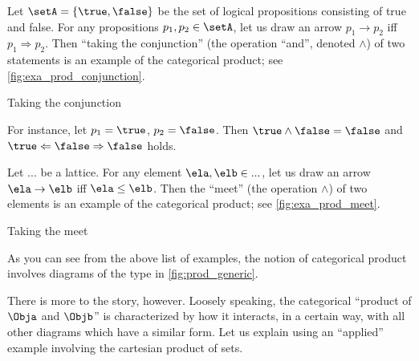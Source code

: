 \begin{example}\label{exa:conjunction-as-prod}
Let $\setA = \{ \true, \false \}$ be the set of logical propositions consisting of true and false. For any propositions $p_1, p_2  \in \setA$, let us draw an arrow $p_1 \to p_2$ iff $p_1 \Rightarrow p_2$. Then ``taking the conjunction'' (the operation ``and'', denoted $\wedge$) of two statements is an example of the categorical product; see \cref{fig:exa_prod_conjunction}. 
  \begin{marginfigure}
  \begin{center}
  \end{center}
    \caption{Taking the conjunction}
    \label{fig:exa_prod_conjunction}
  \end{marginfigure}
 For instance, let $p_1 = \true$, $p_2 = \false$. Then $\true \wedge \false = \false$ and $\true \Leftarrow \false \Rightarrow \false$ holds. 
\end{example}

\begin{example}\label{exa:meet-as-prod}
Let $...$ be a lattice. For any element $\ela, \elb \in ...$, let us draw an arrow $\ela \to \elb$ iff $\ela \leq \elb$. Then the ``meet'' (the operation $\wedge$) of two elements is an example of the categorical product; see \cref{fig:exa_prod_meet}. 
  \begin{marginfigure}
  \begin{center}
  \end{center}
    \caption{Taking the meet}
    \label{fig:exa_prod_meet}
  \end{marginfigure}
\end{example}

As you can see from the above list of examples, the notion of categorical product involves diagrams of the type in \cref{fig:prod_generic}. 

  \begin{marginfigure}
  \begin{center}
  \end{center}
  \caption{}
    \label{fig:prod_generic}
  \end{marginfigure}
There is more to the story, however. Loosely speaking, the categorical ``product of $\Obja$ and $\Objb$'' is characterized by how it interacts, in a certain way, with all other diagrams which have a similar form. Let us explain using an ``applied'' example involving the cartesian product of sets. 

